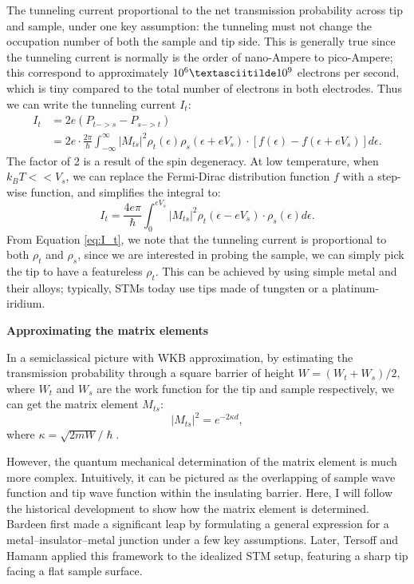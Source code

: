 The tunneling current proportional to the net transmission probability across tip and sample, under one key assumption: the tunneling must not change the occupation number of both the sample and tip side. This is generally true since the tunneling current is normally is the order of nano-Ampere to pico-Ampere; this correspond to approximately $10^6 \textasciitilde 10^9$ electrons per second, which is tiny compared to the total number of electrons in both electrodes. Thus we can write the tunneling current $I_t$:
\begin{align}
	I_t & = 2e(P_{t->s}-P_{s->t})\\
	& = 2e \cdot \frac{2\pi}{\hslash}\int_{-\infty}^{\infty}|M_{ts}|^2\rho_t(\epsilon) \rho_s(\epsilon + eV_s) \cdot[f(\epsilon) - f(\epsilon + eV_s)] d\epsilon.
\end{align}
The factor of 2 is a result of the spin degeneracy. At low temperature, when $k_BT<<V_s$, we can replace the Fermi-Dirac distribution function $f$ with a step-wise function, and simplifies the integral to: 
\begin{equation}
	\label{eq:I_t}
	I_t = \frac{4e\pi}{\hslash}\int_{0}^{eV_s}|M_{ts}|^2\rho_t(\epsilon - eV_s) \cdot \rho_s(\epsilon)d\epsilon. 
\end{equation} 
From Equation \ref{eq:I_t}, we note that the tunneling current is proportional to both $\rho_t$ and $\rho_s$, since we are interested in probing the sample, we can simply pick the tip to have a featureless $\rho_t$. This can be achieved by using simple metal and their alloys; typically, \ac{STM}s today use tips made of tungsten or a platinum-iridium.


\vspace{1em}
\noindent\textbf{Approximating the matrix elements}

\noindent In a semiclassical picture with WKB approximation, by estimating the transmission probability through a square barrier of height $W = (W_t + W_s)/2$, where $W_t$ and $W_s$ are the work function for the tip and sample respectively, we can get the matrix element $M_{ts}$: 
\begin{equation}
	|M_{ts}|^2 = e^{-2\kappa d},
\end{equation}
where $\kappa = \sqrt{2mW}/\hslash$.

However, the quantum mechanical determination of the matrix element is much more complex. Intuitively, it can be pictured as the overlapping of sample wave function and tip wave function within the insulating barrier. Here, I will follow the historical development to show how the matrix element is determined. Bardeen first made a significant leap by formulating a general expression for a metal–insulator–metal junction under a few key assumptions. Later, Tersoff and Hamann applied this framework to the idealized STM setup, featuring a sharp tip facing a flat sample surface.

